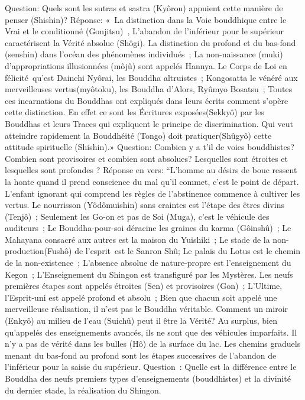 Question:
Quels sont les sutras et sastra (Kyôron)  appuient cette manière de penser (Shishin)?
Réponse:
« La distinction dans la Voie bouddhique entre le Vrai et le conditionné (Gonjitsu) ,
L'abandon de l'inférieur pour le supérieur caractérisent la Vérité absolue (Shôgi).
La distinction du profond et du bas-fond (senshin) dans l'océan des phénomènes individués ;
La non-naissance (muki) d'appropriations illusionnées (môjû) sont appelés Hannya.
Le Corps de Loi en félicité qu'est Dainchi Nyôrai, les Bouddha altruistes ;
Kongosatta le vénéré aux merveilleuses vertus(myôtoku), les Bouddha d'Alors, Ryûmyo Bosatsu ;
Toutes ces incarnations du Bouddhas ont expliqués dans leurs écrits comment s'opère cette distinction.
En effet ce sont les Écritures exposées(Sekkyô) par les Bouddhas et leurs Traces qui expliquent le principe de discrimination.
Qui veut atteindre rapidement la Bouddhéité (Tongo) doit pratiquer(Shûgyô) cette attitude spirituelle (Shishin).»
Question: Combien y a t’il de voies bouddhistes? Combien sont provisoires et combien sont absolues? Lesquelles sont étroites et lesquelles sont profondes ?
Réponse en vers:
“L'homme au désirs de bouc ressent la honte quand il prend conscience du mal qu'il commet, c'est le point de départ.
L’enfant ignorant qui comprend les règles de l'abstinence commence  à cultiver les vertus.
Le nourrisson (Yôdômuishin) sans craintes est l’étape des êtres divins (Tenjô) ;
Seulement les Go-on et pas de Soi (Muga), c’est le véhicule des auditeurs ;
Le Bouddha-pour-soi déracine les graines du karma (Gôinshû) ;
Le Mahayana consacré aux autres est la maison du Yuishiki ;
Le stade de la non-production(Fushô) de l'esprit est le Sanron Shû;
Le palais du Lotus est le chemin de la non-existence ;
L’absence absolue de nature-propre est l’enseignement du Kegon ;
L’Enseignement du Shingon est transfiguré par les Mystères.
Les neufs premières étapes sont appelés étroites (Sen) et provisoires (Gon) ;
L’Ultime, l’Esprit-uni est appelé profond et absolu ;
Bien que chacun soit appelé une merveilleuse réalisation, il n’est pas le Bouddha véritable.
Comment un miroir (Enkyô) au milieu de l’eau (Suichû) peut il être la Vérité?
Au surplus, bien qu’appelés des enseignements avancés, ils ne sont que des véhicules imparfaits.
Il n’y a pas de vérité dans les bulles (Hô) de la surface du lac.
Les chemins graduels menant du bas-fond au profond sont les étapes successives de l’abandon de l’inférieur pour la saisie du supérieur.
Question : Quelle est la différence entre le Bouddha des neufs premiers types d’enseignements (bouddhistes) et la divinité du dernier stade, la réalisation du Shingon.
